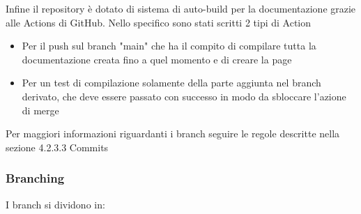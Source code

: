         Infine il repository è dotato di sistema di auto-build per la documentazione grazie alle Actions di GitHub. Nello specifico sono stati scritti 2 tipi di Action
        \begin{itemize}
            \item Per il push sul branch "main" che ha il compito di compilare tutta la documentazione creata fino a quel momento e di creare la page
            \item Per un test di compilazione solamente della parte aggiunta nel branch derivato, che deve essere passato con successo in modo da sbloccare l'azione di merge
        \end{itemize}
        Per maggiori informazioni riguardanti i branch seguire le regole descritte nella sezione 4.2.3.3 Commits

        \subsubsection{Branching}
        I branch si dividono in:

